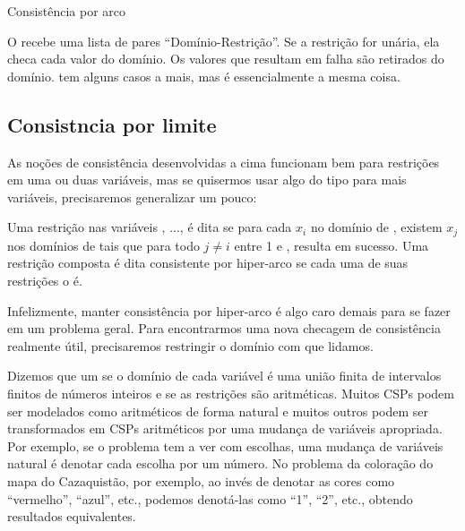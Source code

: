 \begin{listing}[H]
  \inputminted{prolog}{../Exemplos/Cap9/arc_consistency.pl}\label{lst:arc_consistency}
  \caption{Consistência por arco}
\end{listing}

O  recebe uma lista de pares
``Domínio-Restrição''. Se a restrição for unária, ela checa cada valor
do domínio.  Os valores que resultam em falha são retirados do
domínio.  tem alguns casos a mais,
mas é essencialmente a mesma coisa.

\subsection{Consistncia por limite}

As noções de consistência desenvolvidas a cima funcionam bem para
restrições em uma ou duas variáveis, mas se quisermos usar algo do
tipo para mais variáveis, precisaremos generalizar um pouco:

\begin{definition}
  Uma restrição  nas variáveis , ...,
   é dita  se para
  cada $x_i$ no domínio de , existem $x_j$ nos domínios de
   tais que para todo $j \neq i$ entre 1 e ,
   resulta em sucesso. Uma
  restrição composta é dita consistente por hiper-arco se cada uma de
  suas restrições o é.
\end{definition}

Infelizmente, manter consistência por hiper-arco é algo caro demais
para se fazer em um problema geral. Para encontrarmos uma nova
checagem de consistência realmente útil, precisaremos restringir o
domínio com que lidamos.

Dizemos que um  se o domínio de cada
variável é uma união finita de intervalos finitos de números inteiros
e se as restrições são aritméticas. Muitos CSPs podem ser modelados
como aritméticos de forma natural e muitos outros podem ser
transformados em CSPs aritméticos por uma mudança de variáveis
apropriada.  Por exemplo, se o problema tem a ver com escolhas, uma
mudança de variáveis natural é denotar cada escolha por um número. No
problema da coloração do mapa do Cazaquistão, por exemplo, ao invés de
denotar as cores como ``vermelho'', ``azul'', etc., podemos denotá-las
como ``1'', ``2'', etc., obtendo resultados equivalentes.

